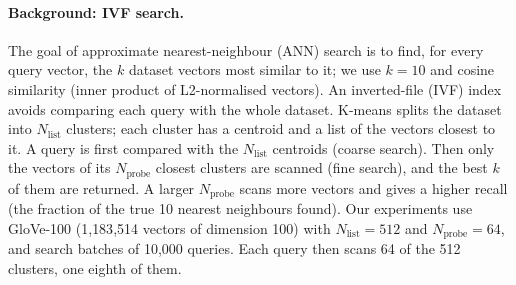 
\paragraph{Background: IVF search.} The goal of approximate nearest-neighbour
(ANN) search is to find, for every query vector, the \(k\) dataset vectors most
similar to it; we use \(k = 10\) and cosine similarity (inner product of
L2-normalised vectors). An inverted-file (IVF) index avoids comparing each query
with the whole dataset. K-means splits the dataset into \(N_{\mathrm{list}}\)
clusters; each cluster has a centroid and a list of the vectors closest to it.
A query is first compared with the \(N_{\mathrm{list}}\) centroids (coarse
search). Then only the vectors of its \(N_{\mathrm{probe}}\) closest clusters are
scanned (fine search), and the best \(k\) of them are returned. A larger
\(N_{\mathrm{probe}}\) scans more vectors and gives a higher recall (the fraction
of the true 10 nearest neighbours found). Our experiments use GloVe-100
(1{,}183{,}514 vectors of dimension 100) with \(N_{\mathrm{list}} = 512\) and
\(N_{\mathrm{probe}} = 64\), and search batches of 10{,}000 queries. Each query
then scans 64 of the 512 clusters, one eighth of them.

